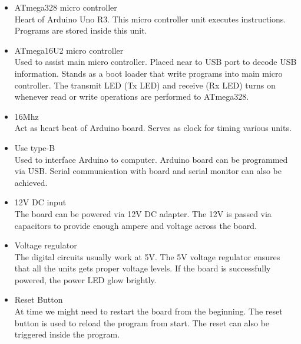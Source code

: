     \begin{itemize}
        \item ATmega328 micro controller \\
        Heart of Arduino Uno R3. This micro controller unit executes instructions. Programs are stored inside this unit.
        \item ATmega16U2 micro controller\\
        Used to assist main micro controller. Placed near to USB port to decode USB information. Stands as a boot loader that write programs into main micro controller. The transmit LED (Tx LED) and receive (Rx LED) turns on whenever read or write operations are performed to ATmega328. 
        \item 16Mhz\\
        Act as heart beat of Arduino board. Serves as clock for timing various units.
        \item Use type-B\\
        Used to interface Arduino to computer. Arduino board can be programmed via USB. Serial communication with board and serial monitor can also be achieved.
        \item 12V DC input\\
        The board can be powered via 12V DC adapter. The 12V is passed via capacitors to provide enough ampere and voltage across the board.
        \item Voltage regulator\\
        The digital circuits usually work at 5V. The 5V voltage regulator ensures that all the units gets proper voltage levels. If the board is successfully powered, the power LED glow brightly.
        \item Reset Button\\
        At time we might need to restart the board from the beginning. The reset button is used to reload the program from start. The reset can also be triggered inside the program.
    \end{itemize}
    
